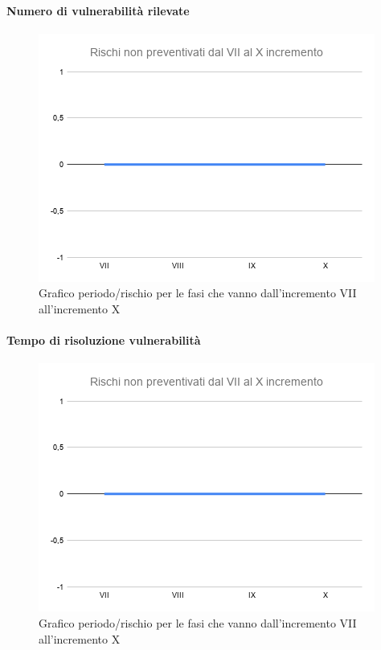 \paragraph{Numero di vulnerabilità rilevate}
\begin{figure}[H]
			\centering%
			\includegraphics[width=0.8\linewidth]{./res/images/RischiNonPreven_4.png}
			\caption{Grafico periodo/rischio per le fasi che vanno dall'incremento VII all'incremento X}
			\label{fig:Grafico periodo/rischio per le fasi che vanno dall'incremento VII all'incremento X}
	\end{figure}
\paragraph{Tempo di risoluzione vulnerabilità}
\begin{figure}[H]
			\centering%
			\includegraphics[width=0.8\linewidth]{./res/images/RischiNonPreven_4.png}
			\caption{Grafico periodo/rischio per le fasi che vanno dall'incremento VII all'incremento X}
			\label{fig:Grafico periodo/rischio per le fasi che vanno dall'incremento VII all'incremento X}
	\end{figure}

